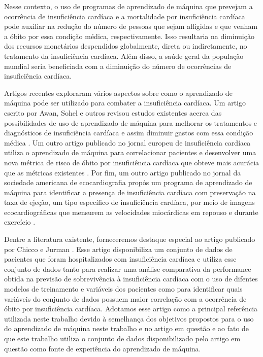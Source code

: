 Nesse contexto, o uso de programas de aprendizado de máquina que prevejam a ocorrência de insuficiência cardíaca e a mortalidade por insuficiência cardíaca pode auxiliar na redução do número de pessoas que sejam afligidas e que venham a óbito por essa condição médica, respectivamente. Isso resultaria na diminuição dos recursos monetários despendidos globalmente, direta ou indiretamente, no tratamento da insuficiência cardíaca. Além disso, a saúde geral da população mundial seria beneficiada com a diminuição do número de ocorrências de insuficiência cardíaca.

Artigos recentes exploraram vários aspectos sobre como o aprendizado de máquina pode ser utilizado para combater a insuficiência cardíaca. Um artigo escrito por Awan, Sohel e outros revisou estudos existentes acerca das possibilidades de uso de aprendizado de máquina para melhorar os tratamentos e diagnósticos de insuficiência cardíaca e assim diminuir gastos com essa condição médica \cite{awan2018}. Um outro artigo publicado no jornal europeu de insuficiência cardíaca utiliza o aprendizado de máquina para correlacionar pacientes e desenvolver uma nova métrica de risco de óbito por insuficiência cardíaca que obteve mais acurácia que as métricas existentes \cite{adler2020}. Por fim, um outro artigo publicado no jornal da sociedade americana de ecocardiografia propós um programa de aprendizado de máquina para identificar a presença de insuficiência cardíaca com preservação na taxa de ejeção, um tipo específico de insuficiência cardíaca, por meio de imagens ecocardiográficas que mensurem as velocidades miocárdicas em repouso e durante exercício \cite{hfpef2018}.

Dentre a literatura existente, forneceremos destaque especial ao artigo publicado por Chicco e Jurman \cite{chicco2020}. Esse artigo disponibiliza um conjunto de dados de pacientes que foram hospitalizados com insuficiência cardíaca \cite{larxel_dataset} e utiliza esse conjunto de dados tanto para realizar uma análise comparativa da performance obtida na previsão de sobrevivência à insuficiência cardíaca com o uso de difentes modelos de treinamento e variáveis dos pacientes como para identificar quais variáveis do conjunto de dados possuem maior correlação com a ocorrência de óbito por insuficiência cardíaca. Adotamos esse artigo como a principal referência utilizada neste trabalho devido à semelhança dos objetivos propostos para o uso do aprendizado de máquina neste trabalho e no artigo em questão e ao fato de que este trabalho utiliza o conjunto de dados disponibilizado pelo artigo em questão como fonte de experiência do aprendizado de máquina.
